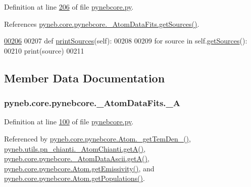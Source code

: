 Definition at line \hyperlink{pynebcore_8py_source_l00206}{206} of file \hyperlink{pynebcore_8py_source}{pynebcore.\-py}.



References \hyperlink{pynebcore_8py_source_l00190}{pyneb.\-core.\-pynebcore.\-\_\-\-Atom\-Data\-Fits.\-get\-Sources()}.


\begin{DoxyCode}
\hypertarget{classpyneb_1_1core_1_1pynebcore_1_1___atom_data_fits_l00206}{}\hyperlink{classpyneb_1_1core_1_1pynebcore_1_1___atom_data_fits_a1915aa59aa8cb2b5a3f9a7b381009f17}{00206} 
00207     \textcolor{keyword}{def }\hyperlink{classpyneb_1_1core_1_1pynebcore_1_1___atom_data_fits_a1915aa59aa8cb2b5a3f9a7b381009f17}{printSources}(self):
00208         
00209         \textcolor{keywordflow}{for} source \textcolor{keywordflow}{in} self.\hyperlink{classpyneb_1_1core_1_1pynebcore_1_1___atom_data_fits_a371215f15e583f3d8446744ab5d6c0d8}{getSources}():
00210             print(source)    
00211 
    
\end{DoxyCode}


\subsection{Member Data Documentation}
\hypertarget{classpyneb_1_1core_1_1pynebcore_1_1___atom_data_fits_a84351f8e5bae7c23f1318fe9464db1ca}{
\subsubsection[{\-\_\-\-A}]{\setlength{\rightskip}{0pt plus 5cm}pyneb.\-core.\-pynebcore.\-\_\-\-Atom\-Data\-Fits.\-\_\-\-A\hspace{0.3cm}{\ttfamily [private]}}}\label{classpyneb_1_1core_1_1pynebcore_1_1___atom_data_fits_a84351f8e5bae7c23f1318fe9464db1ca}


Definition at line \hyperlink{pynebcore_8py_source_l00100}{100} of file \hyperlink{pynebcore_8py_source}{pynebcore.\-py}.



Referenced by \hyperlink{pynebcore_8py_source_l01869}{pyneb.\-core.\-pynebcore.\-Atom.\-\_\-get\-Tem\-Den\-\_()}, \hyperlink{pn__chianti_8py_source_l00316}{pyneb.\-utils.\-pn\-\_\-chianti.\-\_\-\-Atom\-Chianti.\-get\-A()}, \hyperlink{pynebcore_8py_source_l00487}{pyneb.\-core.\-pynebcore.\-\_\-\-Atom\-Data\-Ascii.\-get\-A()}, \hyperlink{pynebcore_8py_source_l01782}{pyneb.\-core.\-pynebcore.\-Atom.\-get\-Emissivity()}, and \hyperlink{pynebcore_8py_source_l01562}{pyneb.\-core.\-pynebcore.\-Atom.\-get\-Populations()}.

